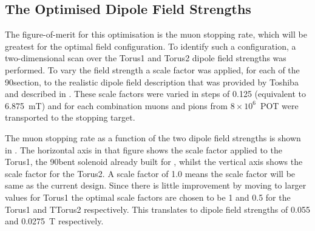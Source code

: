 \subsection{The Optimised Dipole Field Strengths}
The figure-of-merit for this optimisation is the muon stopping rate, which will be greatest for the optimal field configuration.
To identify such a configuration, a two-dimensional scan over the Torus1 and Torus2 dipole field strengths was performed.
To vary the field strength a scale factor was applied, for each of the 90\degree section, to the realistic dipole field description that was provided by Toshiba and described in .
These scale factors were varied in steps of 0.125 (equivalent to 6.875~mT) and for each combination muons and pions from $8\times10^6$~POT were transported to the stopping target.

\FigOptimMuBeamDipoleMuStops
\FigOptimMuBeamDipolePiStops

The muon stopping rate as a function of the two dipole field strengths is shown in .
The horizontal axis in that figure shows the scale factor applied to the Torus1, the 90\degree bent solenoid already built for \phaseI, whilst the vertical axis shows the scale factor for the Torus2.
A scale factor of 1.0 means the scale factor will be same as the current \phaseI design.
Since there is little improvement by moving to larger values for Torus1 the optimal scale factors are chosen to be 1 and 0.5 for the Torus1 and TTorus2 respectively.  
This translates to dipole field strengths of 0.055 and 0.0275~T respectively.

